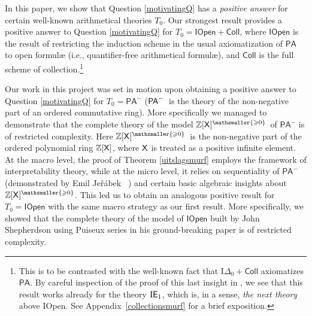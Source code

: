 \documentclass{amsart}
\renewcommand{\geq}{\geqslant}
\newcommand{\pam}{\ensuremath{{\sf PA}^{-}}}
\newcommand{\X}{{\sf X}}
\newcommand{\jer}{Je\v{r}\'abek}
\newcommand{\zxg}{\ensuremath{\mathbb Z[\X]^{\mathsmaller{\geq 0}}}}
\newcommand{\skippy}{}
\begin{document}
\skippy
In this paper, we show that Question \ref{motivatingQ} has a \emph{positive answer}
for certain well-known arithmetical theories $T_{0}$. Our strongest result provides a positive answer to Question \ref{motivatingQ} for $T_{0}=%
\mathsf{IOpen}+\mathsf{Coll}$, where $\mathsf{IOpen}$ is the result of
restricting the induction scheme in the usual axiomatization of $\mathsf{PA}$ to open
formul{\ae} (i.e., quantifier-free arithmetical formul{\ae}), and $\mathsf{Coll}$ is the full scheme of collection.\footnote{This is to be contrasted with the well-known fact that $\mathrm{I}\Delta
_{0}+\mathsf{Coll}$ axiomatizes $\mathsf{PA}$. By careful inspection of the proof
of this last insight in \cite[Lemma 7.4, p84]{kaye:mode91}, we see that this result
works already for the theory $\mathrm I{\sf E}_1$, which is, in a sense, 
\emph{the next theory} above
{\sf IOpen}. See Appendix~\ref{collectionsmurf} for a brief exposition.}

\skippy
Our work in this project was set in motion upon obtaining a positive answer to Question \ref{motivatingQ} for $T_{0}= \mathsf{PA}^{-}$ (\pam\ is the theory of the non-negative
part of an ordered commutative ring). More specifically we managed to demonstrate that the complete theory of the 
model \zxg\ of $\mathsf{PA}^{-}$ is of restricted complexity.
Here \zxg\ is the non-negative part of the ordered polynomial ring 
$\mathbb Z[\X]$, where $\X$ is treated as a positive infinite element. At the macro level, the proof of Theorem \ref{uitslagsmurf} employs the
framework of interpretability theory, while at the micro level, it relies on sequentiality of $\mathsf{PA}^{-}$ 
(demonstrated by Emil \jer~ \cite{jera:sequ12}) and
certain basic algebraic insights about \zxg. This led us to obtain an analogous positive result for 
$T_{0}=\mathsf{IOpen}$ with the same macro strategy as our first result. More specifically, we showed that the complete theory of 
the model of $\mathsf{IOpen}$ built by John Shepherdson using Puiseux series
in his ground-breaking paper \cite{shep:nons64} is of restricted complexity.
\end{document}
